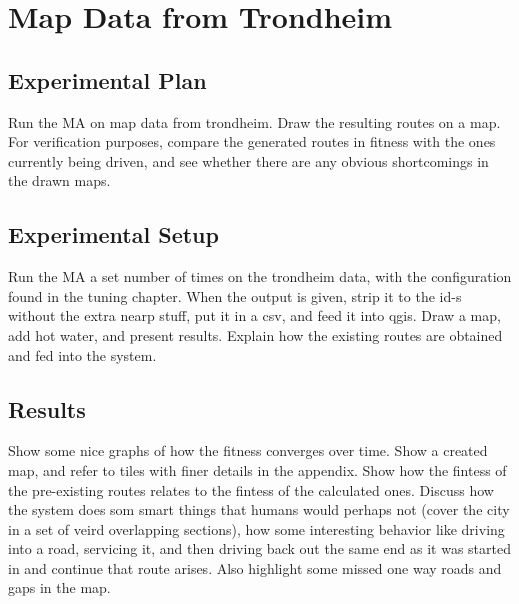 \section{Map Data from Trondheim}

\subsection{Experimental Plan}
Run the MA on map data from trondheim. Draw the resulting routes on a map. For verification purposes, compare the generated routes in fitness with the ones currently being driven, and see whether there are any obvious shortcomings in the drawn maps.

\subsection{Experimental Setup}
Run the MA a set number of times on the trondheim data, with the configuration found in the tuning chapter. When the output is given, strip it to the id-s without the extra nearp stuff, put it in a csv, and feed it into qgis. Draw a map, add hot water, and present results.
Explain how the existing routes are obtained and fed into the system.

\subsection{Results}
Show some nice graphs of how the fitness converges over time.
Show a created map, and refer to tiles with finer details in the appendix.
Show how the fintess of the pre-existing routes relates to the fintess of the calculated ones.
Discuss how the system does som smart things that humans would perhaps not (cover the city in a set of veird overlapping sections), how some interesting behavior like driving into a road, servicing it, and then driving back out the same end as it was started in and continue that route arises. Also highlight some missed one way roads and gaps in the map.


\cleardoublepage